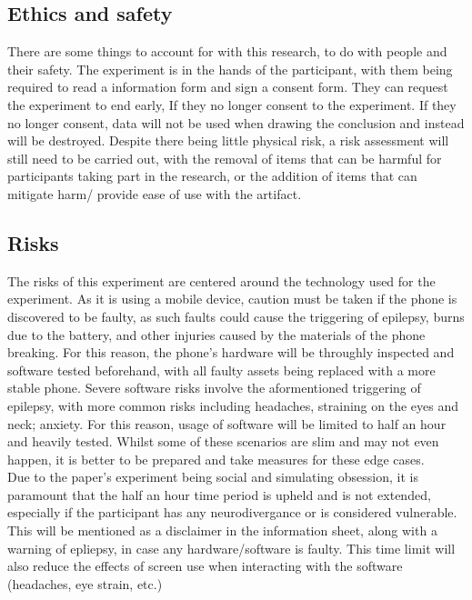 \documentclass[conference]{IEEEtran}
\begin{document}
\subsection{Ethics and safety}
There are some things to account for with this research, to do with people and their safety. The experiment is in the hands of the participant, with them being required to read a information form and sign a consent form. They can request the experiment to end early, If they no longer consent to the experiment.  If they no longer consent, data will not be used when drawing the conclusion and instead will be destroyed. Despite there being little physical risk, a risk assessment will still need to be carried out, with the removal of items that can be harmful for participants taking part in the research, or the addition of items that can mitigate harm/ provide ease of use with the artifact.\\

\subsection{Risks}
The risks of this experiment are centered around the technology used for the experiment. As it is using a mobile device, caution must be taken if the phone is discovered to be faulty, as such faults could cause the triggering of epilepsy, burns due to the battery, and other injuries caused by the materials of the phone breaking. For this reason, the phone's hardware will be throughly inspected and software tested beforehand, with all faulty assets being replaced with a more stable phone. Severe software risks involve the aformentioned triggering of epilepsy, with more common risks including headaches, straining on the eyes and neck; anxiety. For this reason, usage of software will be limited to half an hour and heavily tested. Whilst some of these scenarios are slim and may not even happen, it is better to be prepared and take measures for these edge cases.\\

Due to the paper's experiment being social and simulating obsession, it is paramount that the half an hour time period is upheld and is not extended, especially if the participant has any neurodivergance or is considered vulnerable. This will be mentioned as a disclaimer in the information sheet, along with a warning of epliepsy, in case any hardware/software is faulty. This time limit will also reduce the effects of screen use when interacting with the software (headaches, eye strain, etc.)\\
  
\end{document}

